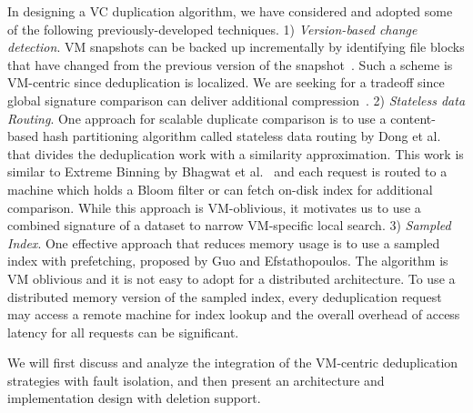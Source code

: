 In designing a VC duplication algorithm, we have considered and adopted some of
the following previously-developed techniques.
1)
{\em Version-based change detection}.
VM snapshots can be  backed up  incrementally by identifying file  blocks that have
changed from the previous version of the snapshot~\cite{Clements2009,Vrable2009,TanIPDPS2011}.
Such a scheme  is  VM-centric since deduplication is localized. 
We are seeking for a tradeoff since 
global signature comparison can deliver additional compression~\cite{Guo2011,Dong2011,extreme_binning09}.
2) {\em Stateless  data Routing}.
One approach for scalable duplicate comparison is to use a content-based hash
partitioning algorithm called stateless data routing by Dong et al.~\cite{Dong2011} 
that divides the deduplication work with a similarity approximation. This work 
is similar to Extreme Binning by Bhagwat et al.~\cite{extreme_binning09} and 
each request is routed  to a machine which holds
a Bloom filter  or can fetch on-disk index for additional comparison.
While this approach is VM-oblivious, it motivates us to  use  a combined signature of a dataset to narrow
VM-specific local search.
3) {\em Sampled Index}.
One effective approach that reduces memory usage is 
to use a sampled index with prefetching, proposed  by Guo and Efstathopoulos\cite{Guo2011}. 
The algorithm is VM oblivious and it is not easy  to adopt for a distributed architecture. 
To use a distributed memory version of the sampled index, every deduplication request
may access a remote machine for index lookup and the overall overhead of access latency for all requests
can be significant.  


We will first discuss and analyze the integration of the VM-centric deduplication strategies with fault isolation, 
and then present
an architecture and implementation design with deletion support.
